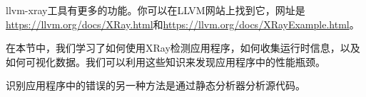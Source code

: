 \begin{tcolorbox}[colback=blue!5!white,colframe=blue!75!black, title=Tip]
llvm-xray工具有更多的功能。你可以在LLVM网站上找到它，网址是\url{https://llvm.org/docs/XRay.html}和\url{https://llvm.org/docs/XRayExample.html}。
\end{tcolorbox}

在本节中，我们学习了如何使用XRay检测应用程序，如何收集运行时信息，以及如何可视化数据。我们可以利用这些知识来发现应用程序中的性能瓶颈。\par

识别应用程序中的错误的另一种方法是通过静态分析器分析源代码。\par
















